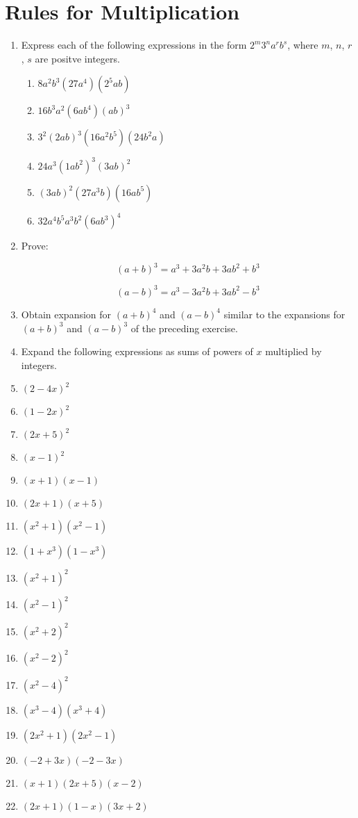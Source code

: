 \documentclass{report}
\def\MLine#1{\par\hspace*{-\leftmargin}\parbox{\textwidth}{\[#1\]}}
\begin{document}
\section{Rules for Multiplication}

\begin{enumerate}
	\item Express each of the following expressions in the form $2^m3^na^rb^s$, where $m$, $n$, $r$, $s$ are positve integers.
		\begin{enumerate}
			\item $8a^2b^3(27a^4)(2^5ab)$
			\item $16b^3a^2(6ab^4)(ab)^3$
			\item $3^2(2ab)^3(16a^2b^5)(24b^2a)$
			\item $24a^3(1ab^2)^3(3ab)^2$
			\item $(3ab)^2(27a^3b)(16ab^5)$
			\item $32a^4b^5a^3b^2(6ab^3)^4$
		\end{enumerate}
	\item Prove:
		\MLine{(a + b)^3 = a^3 + 3a^2b + 3ab^2 + b^3}
		\MLine{(a - b)^3 = a^3 - 3a^2b + 3ab^2 - b^3}
	\item Obtain expansion for $(a + b)^4$ and $(a - b)^4$ similar to the expansions for $(a + b)^3$ and $(a - b)^3$ of the preceding exercise.
	\item[] Expand the following expressions as sums of powers of $x$ multiplied by integers.
	\item $(2 - 4x)^2$
	\item $(1 - 2x)^2$
	\item $(2x + 5)^2$
	\item $(x-1)^2$
	\item $(x + 1)(x-1)$
	\item $(2x + 1)(x + 5)$
	\item $(x^2 + 1)(x^2 - 1)$
	\item $(1 + x^3)(1 - x^3)$
	\item $(x^2 + 1)^2$
	\item $(x^2 - 1)^2$
	\item $(x^2 + 2)^2$
	\item $(x^2 - 2)^2$
	\item $(x^2 - 4)^2$
	\item $(x^3 - 4)(x^3 + 4)$
	\item $(2x^2 + 1)(2x^2 - 1)$
	\item $(-2 + 3x)(-2 - 3x)$
	\item $(x + 1)(2x + 5)(x-2)$
	\item $(2x + 1)(1 - x)(3x + 2)$

\end{enumerate}
\end{document}

